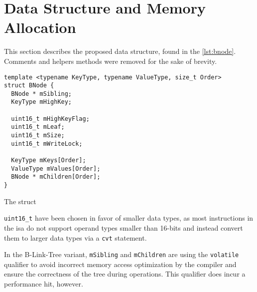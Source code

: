 \section{Data Structure and Memory Allocation}

This section describes the proposed data structure, found in the \cref{lst:bnode}. Comments and helpers methods were removed for the sake of brevity.

\begin{listing}
  \begin{verbatim}
template <typename KeyType, typename ValueType, size_t Order>
struct BNode {
  BNode * mSibling;
  KeyType mHighKey;

  uint16_t mHighKeyFlag;
  uint16_t mLeaf;
  uint16_t mSize;
  uint16_t mWriteLock;

  KeyType mKeys[Order];
  ValueType mValues[Order];
  BNode * mChildren[Order]; 
}
    \end{verbatim}
  \caption{The  struct}\label{lst:bnode}
\end{listing}

\texttt{uint16_t} have been chosen in favor of smaller data types, as most instructions in the \acrshort{isa} do not support operand types smaller than 16-bits and instead convert them to larger data types via a \texttt{cvt} statement.

In the B-Link-Tree variant, \texttt{mSibling} and \texttt{mChildren} are using the \texttt{volatile} qualifier to avoid incorrect memory access optimization by the compiler and ensure the correctness of the tree during operations. This qualifier does incur a performance hit, however.
